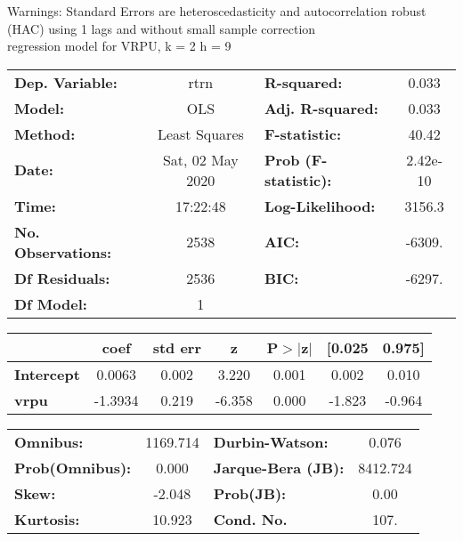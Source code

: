 Warnings: \newline
 [1] Standard Errors are heteroscedasticity and autocorrelation robust (HAC) using 1 lags and without small sample correction\\ 

regression model for VRPU, k = 2 h = 9\begin{center}
\begin{tabular}{lclc}
\toprule
\textbf{Dep. Variable:}    &       rtrn       & \textbf{  R-squared:         } &     0.033   \\
\textbf{Model:}            &       OLS        & \textbf{  Adj. R-squared:    } &     0.033   \\
\textbf{Method:}           &  Least Squares   & \textbf{  F-statistic:       } &     40.42   \\
\textbf{Date:}             & Sat, 02 May 2020 & \textbf{  Prob (F-statistic):} &  2.42e-10   \\
\textbf{Time:}             &     17:22:48     & \textbf{  Log-Likelihood:    } &    3156.3   \\
\textbf{No. Observations:} &        2538      & \textbf{  AIC:               } &    -6309.   \\
\textbf{Df Residuals:}     &        2536      & \textbf{  BIC:               } &    -6297.   \\
\textbf{Df Model:}         &           1      & \textbf{                     } &             \\
\bottomrule
\end{tabular}
\begin{tabular}{lcccccc}
                   & \textbf{coef} & \textbf{std err} & \textbf{z} & \textbf{P$> |$z$|$} & \textbf{[0.025} & \textbf{0.975]}  \\
\midrule
\textbf{Intercept} &       0.0063  &        0.002     &     3.220  &         0.001        &        0.002    &        0.010     \\
\textbf{vrpu}      &      -1.3934  &        0.219     &    -6.358  &         0.000        &       -1.823    &       -0.964     \\
\bottomrule
\end{tabular}
\begin{tabular}{lclc}
\textbf{Omnibus:}       & 1169.714 & \textbf{  Durbin-Watson:     } &    0.076  \\
\textbf{Prob(Omnibus):} &   0.000  & \textbf{  Jarque-Bera (JB):  } & 8412.724  \\
\textbf{Skew:}          &  -2.048  & \textbf{  Prob(JB):          } &     0.00  \\
\textbf{Kurtosis:}      &  10.923  & \textbf{  Cond. No.          } &     107.  \\
\bottomrule
\end{tabular}
\end{center}


